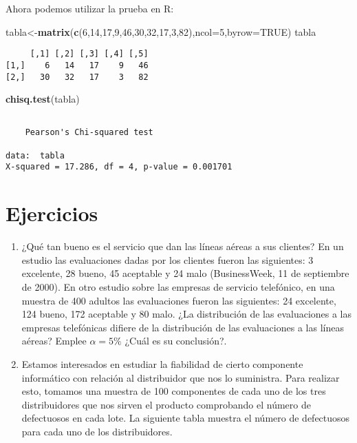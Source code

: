\documentclass[
  a4paper,
  oneside,
  openany]{book}
\newenvironment{Shaded}{\begin{snugshade}}{\end{snugshade}}
\newcommand{\AttributeTok}[1]{\textcolor[rgb]{0.13,0.29,0.53}{#1}}
\newcommand{\ConstantTok}[1]{\textcolor[rgb]{0.56,0.35,0.01}{#1}}
\newcommand{\DecValTok}[1]{\textcolor[rgb]{0.00,0.00,0.81}{#1}}
\newcommand{\FunctionTok}[1]{\textcolor[rgb]{0.13,0.29,0.53}{\textbf{#1}}}
\newcommand{\NormalTok}[1]{#1}
\newcommand{\OtherTok}[1]{\textcolor[rgb]{0.56,0.35,0.01}{#1}}
\begin{document}
Ahora podemos utilizar la prueba en R:

\begin{Shaded}
\begin{Highlighting}[]
\NormalTok{tabla}\OtherTok{\textless{}{-}}\FunctionTok{matrix}\NormalTok{(}\FunctionTok{c}\NormalTok{(}\DecValTok{6}\NormalTok{,}\DecValTok{14}\NormalTok{,}\DecValTok{17}\NormalTok{,}\DecValTok{9}\NormalTok{,}\DecValTok{46}\NormalTok{,}\DecValTok{30}\NormalTok{,}\DecValTok{32}\NormalTok{,}\DecValTok{17}\NormalTok{,}\DecValTok{3}\NormalTok{,}\DecValTok{82}\NormalTok{),}\AttributeTok{ncol=}\DecValTok{5}\NormalTok{,}\AttributeTok{byrow=}\ConstantTok{TRUE}\NormalTok{)}
\NormalTok{tabla}
\end{Highlighting}
\end{Shaded}

\begin{verbatim}
     [,1] [,2] [,3] [,4] [,5]
[1,]    6   14   17    9   46
[2,]   30   32   17    3   82
\end{verbatim}

\begin{Shaded}
\begin{Highlighting}[]
\FunctionTok{chisq.test}\NormalTok{(tabla)}
\end{Highlighting}
\end{Shaded}

\begin{verbatim}

    Pearson's Chi-squared test

data:  tabla
X-squared = 17.286, df = 4, p-value = 0.001701
\end{verbatim}

\hypertarget{ejercicios-10}{%
\section{Ejercicios}\label{ejercicios-10}}

\begin{enumerate}
\def\labelenumi{\arabic{enumi}.}
\item
  ¿Qué tan bueno es el servicio que dan las líneas aéreas a sus clientes? En un estudio las evaluaciones dadas por los clientes fueron las siguientes: 3 excelente, 28 bueno, 45 aceptable y 24 malo (BusinessWeek, 11 de septiembre de 2000). En otro estudio sobre las empresas de servicio telefónico, en una muestra de 400 adultos las evaluaciones fueron las siguientes: 24 excelente, 124 bueno, 172 aceptable y 80 malo. ¿La distribución de las evaluaciones a las empresas telefónicas difiere de la distribución de las evaluaciones a las líneas aéreas? Emplee \(\alpha=5\%\) ¿Cuál es su conclusión?.
\item
  Estamos interesados en estudiar la fiabilidad de cierto componente informático con relación al distribuidor que nos lo suministra. Para realizar esto, tomamos una muestra de 100 componentes de cada uno de los tres distribuidores que nos sirven el producto comprobando el número de defectuosos en cada lote. La siguiente tabla muestra el número de defectuosos para cada uno de los distribuidores.
\end{enumerate}
\end{document}
